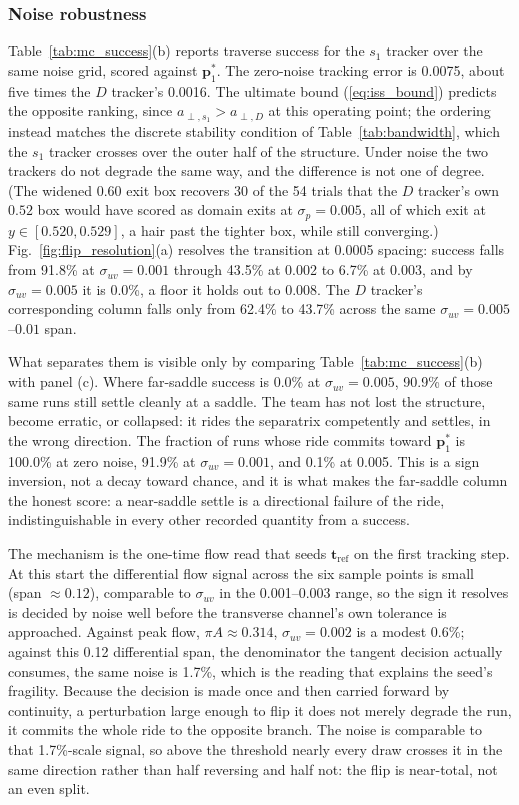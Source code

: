 \documentclass[lettersize,journal]{IEEEtran}
\begin{document}
\subsubsection{Noise robustness}
Table~\ref{tab:mc_success}(b) reports traverse success for the $s_1$
tracker over the same noise grid, scored against $\mathbf{p}^*_1$. The
zero-noise tracking error is 0.0075, about five times the $D$ tracker's
0.0016. The ultimate bound (\ref{eq:iss_bound}) predicts the opposite
ranking, since $a_{\perp,s_1} > a_{\perp,D}$ at this operating point;
the ordering instead matches the discrete stability condition of
Table~\ref{tab:bandwidth}, which the $s_1$ tracker crosses over the
outer half of the structure.
Under noise the two trackers do not degrade the same way, and the
difference is not one of degree. (The widened $0.60$ exit box recovers
30 of the 54 trials that the $D$ tracker's own $0.52$ box would have
scored as domain exits at $\sigma_p = 0.005$, all of which exit at $y
\in [0.520, 0.529]$, a hair past the tighter box, while still
converging.) Fig.~\ref{fig:flip_resolution}(a)
resolves the transition at 0.0005 spacing: success falls from 91.8\% at
$\sigma_{uv} = 0.001$ through 43.5\% at 0.002 to 6.7\% at 0.003, and by
$\sigma_{uv} = 0.005$ it is 0.0\%, a floor it holds out to 0.008. The
$D$ tracker's corresponding column falls only from 62.4\% to 43.7\%
across the same $\sigma_{uv} = 0.005$--$0.01$ span.

What separates them is visible only by comparing
Table~\ref{tab:mc_success}(b) with panel (c). Where far-saddle success
is 0.0\% at $\sigma_{uv} = 0.005$, 90.9\% of those same runs still
settle cleanly at a saddle. The team has not lost the structure, become
erratic, or collapsed: it rides the separatrix competently and settles,
in the wrong direction. The fraction of runs whose ride commits toward
$\mathbf{p}^*_1$ is 100.0\% at zero noise, 91.9\% at
$\sigma_{uv} = 0.001$, and 0.1\% at 0.005. This is a sign inversion,
not a decay toward chance, and it is what makes the far-saddle column
the honest score: a near-saddle settle is a directional failure of the
ride, indistinguishable in every other recorded quantity from a
success.

The mechanism is the one-time flow read that seeds
$\mathbf{t}_{\text{ref}}$
on the first tracking step. At this start the differential flow signal
across the six sample points is small (span $\approx 0.12$), comparable
to $\sigma_{uv}$ in the 0.001--0.003 range, so the sign it resolves is
decided by noise well before the transverse channel's own tolerance is
approached. Against peak flow, $\pi A \approx 0.314$, $\sigma_{uv} =
0.002$ is a modest 0.6\%; against this 0.12 differential span, the
denominator the tangent decision actually consumes, the same noise is
1.7\%, which is the reading that explains the seed's fragility. Because
the decision is made once and then carried forward by continuity, a
perturbation large enough to flip it does not merely degrade the run, it
commits the whole ride to the opposite branch. The noise is comparable
to that 1.7\%-scale signal, so above the threshold nearly every draw
crosses it in the same direction rather than half reversing and half
not: the flip is near-total, not an even split.
\end{document}
